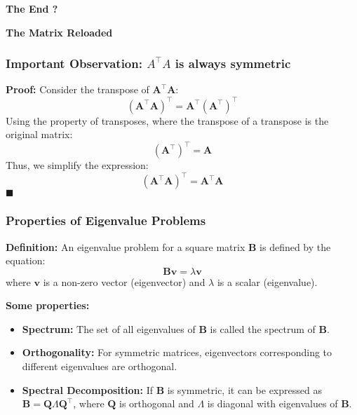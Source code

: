 \documentclass[aspectratio=169]{beamer}
\begin{document}
\begin{frame}
    \centering
    \vfill
    {\Huge \textbf{The End \pause ?}}
    \vfill
\end{frame}

\begin{frame}
    \centering
    \vfill
    {\Huge \textbf{The Matrix Reloaded}}
    \vfill
\end{frame}

\begin{frame}
\frametitle{Important Observation: \( A^\top A \) is always symmetric}

\textbf{Proof:}
Consider the transpose of \( \mathbf{A}^\top \mathbf{A} \):
\[
(\mathbf{A}^\top \mathbf{A})^\top = \mathbf{A}^\top (\mathbf{A}^\top)^\top
\]
\pause
Using the property of transposes, where the transpose of a transpose is the original matrix:
\[
(\mathbf{A}^\top)^\top = \mathbf{A}
\]
\pause
Thus, we simplify the expression:
\[
(\mathbf{A}^\top \mathbf{A})^\top = \mathbf{A}^\top \mathbf{A}
\]
\pause
\(\blacksquare\)


\end{frame}




\begin{frame}
\frametitle{Properties of Eigenvalue Problems}

\textbf{Definition:}
An eigenvalue problem for a square matrix \( \mathbf{B} \) is defined by the equation:
\[
\mathbf{B} \mathbf{v} = \lambda \mathbf{v}
\]
where \( \mathbf{v} \) is a non-zero vector (eigenvector) and \( \lambda \) is a scalar (eigenvalue).
\pause

\textbf{Some properties:}
\begin{itemize}
    \item \textbf{Spectrum:} The set of all eigenvalues of \( \mathbf{B} \) is called the spectrum of \( \mathbf{B} \).
    \item \textbf{Orthogonality:} For symmetric matrices, eigenvectors corresponding to different eigenvalues are orthogonal.
    \item \textbf{Spectral Decomposition:} If \( \mathbf{B} \) is symmetric, it can be expressed as \( \mathbf{B} = \mathbf{Q} \Lambda \mathbf{Q}^\top \), where \( \mathbf{Q} \) is orthogonal and \( \Lambda \) is diagonal with eigenvalues of \( \mathbf{B} \).
\end{itemize}

\end{frame}
\end{document}
